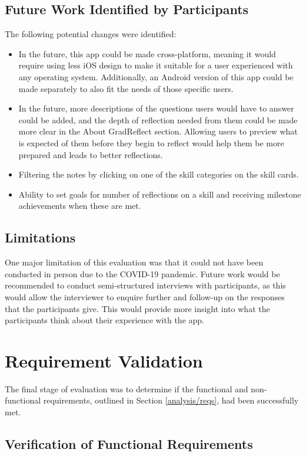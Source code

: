 \documentclass{l4proj}
\begin{document}
\subsection{Future Work Identified by Participants}
The following potential changes were identified:
\begin{itemize}
    \item In the future, this app could be made cross-platform, meaning it would require using less iOS design to make it suitable for a user experienced with any operating system. Additionally, an Android version of this app could be made separately to also fit the needs of those specific users. 
    \item In the future, more descriptions of the questions users would have to answer could be added, and the depth of reflection needed from them could be made more clear in the About GradReflect section. Allowing users to preview what is expected of them before they begin to reflect would help them be more prepared and leads to better reflections.
    \item Filtering the notes by clicking on one of the skill categories on the skill cards.
    \item Ability to set goals for number of reflections on a skill and receiving milestone achievements when these are met.

\end{itemize}

\subsection{Limitations}
One major limitation of this evaluation was that it could not have been conducted in person due to the COVID-19 pandemic. Future work would be recommended to conduct semi-structured interviews with participants, as this would allow the interviewer to enquire further and follow-up on the responses that the participants give. This would provide more insight into what the participants think about their experience with the app.

\section{Requirement Validation}

The final stage of evaluation was to determine if the functional and non-functional requirements, outlined in Section \ref{analysis/reqs}, had been successfully met. 

\subsection{Verification of Functional Requirements}
\end{document}
